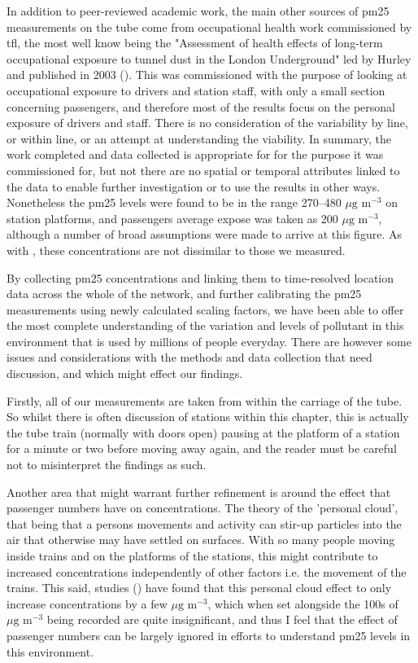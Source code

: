 In addition to peer-reviewed academic work, the main other sources of \gls{pm25} measurements on the tube come from occupational health work commissioned by \gls{tfl}, the most well know being the "Assessment of health effects of long-term occupational exposure to tunnel dust in the London Underground" led by Hurley and published in 2003 (\cite{Hurley2003}). This was commissioned with the purpose of looking at occupational exposure to drivers and station staff, with only a small section concerning passengers, and therefore most of the results focus on the personal exposure of drivers and staff. There is no consideration of the variability by line, or within line, or an attempt at understanding the viability. In summary, the work completed and data collected is appropriate for for the purpose it was commissioned for, but not there are no spatial or temporal attributes linked to the data to enable further investigation or to use the results in other ways. Nonetheless the \gls{pm25} levels were found to be in the range 270--480 $\mu \text{g m}^{-3}$ on station platforms, and passengers average expose was taken as 200 $\mu \text{g m}^{-3}$, although a number of broad assumptions were made to arrive at this figure. As with \cite{Nieuwenhuijsen2007}, these concentrations are not dissimilar to those we measured.

By collecting \gls{pm25} concentrations and linking them to time-resolved location data across the whole of the network, and further calibrating the \gls{pm25} measurements using newly calculated scaling factors, we have been able to offer the most complete understanding of the variation and levels of pollutant in this environment that is used by millions of people everyday. There are however some issues and considerations with the methods and data collection that need discussion, and which might effect our findings. 

Firstly, all of our measurements are taken from within the carriage of the tube. So whilst there is often discussion of stations within this chapter, this is actually the tube train (normally with doors open) pausing at the platform of a station for a minute or two before moving away again, and the reader must be careful not to misinterpret the findings as such. 

Another area that might warrant further refinement is around the effect that passenger numbers have on concentrations. The theory of the 'personal cloud', that being that a persons movements and activity can stir-up particles into the air that otherwise may have settled on surfaces. With so many people moving inside trains and on the platforms of the stations, this might contribute to increased concentrations independently of other factors i.e. the movement of the trains. This said, studies (\cite{Ferro2004a}) have found that this personal cloud effect to only increase concentrations by a few $\mu \text{g m}^{-3}$, which when set alongside the 100s of $\mu \text{g m}^{-3}$ being recorded are quite insignificant, and thus I feel that the effect of passenger numbers can be largely ignored in efforts to understand \gls{pm25} levels in this environment.

